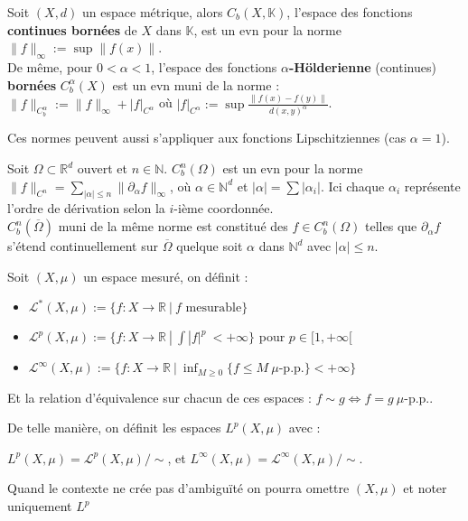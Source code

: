 \begin{ex}
    Soit $(X,d)$ un espace métrique, alors $C_b(X,\mathbb{K})$, l'espace des fonctions \textbf{continues bornées} de $X$ dans $\mathbb{K}$, est un evn pour la norme $\|f\|_\infty :=\sup\|f(x)\|$.\\
    De même, pour $ 0<\alpha <1$, l'espace des fonctions \textbf{$\alpha$-Hölderienne} (continues) \textbf{bornées} $C^\alpha_b(X)$ est un evn muni de la norme : \\
    $\|f\|_{C^\alpha_b }:=\|f\|_\infty +|f|_{C^\alpha }$ où $|f|_{C^\alpha }:=\sup \frac{\|f(x)-f(y)\|}{d(x,y)^\alpha }$.
\end{ex}
Ces normes peuvent aussi s'appliquer aux fonctions Lipschitziennes (cas $\alpha = 1$).

\begin{ex}
    Soit $\Omega\subset \mathbb{R} ^d$ ouvert et $n\in \mathbb{N} $. $C^n _b(\Omega)$ est un evn pour la norme $\| f \|_{C^n } = \sum_{|\alpha|\leq n } \| \partial_\alpha f \|_\infty$, où $\alpha \in \mathbb{N}^d$ et $|\alpha| = \sum |\alpha_i|$. Ici chaque $\alpha_i$ représente l'ordre de dérivation selon la $i$-ième coordonnée. \\
    
    $C^n_b(\overline{\Omega})$ muni de la même norme est constitué des $f\in C^n_b(\Omega)$ telles que $\partial_\alpha f$ s'étend continuellement sur $\overline{\Omega}$ quelque soit $\alpha$ dans $\mathbb{N}^d$ avec $|\alpha| \leq n $. 
\end{ex}

\begin{definition}[Espaces $L^p$]

Soit $(X,\mu)$ un espace mesuré, on définit : 

\begin{itemize}
    \item $\mathcal{L}^*(X,\mu):=\{f:X\to \mathbb{R} \ |\ f \text{ mesurable}\}$
    \item $\mathcal{L}^p(X,\mu) := \{ f : X \to \mathbb{R} ~|~ \int |f|^p \ < +\infty\}$ pour $p \in [1,+\infty[$
    \item $\mathcal{L}^\infty(X,\mu) := \{f : X \to \mathbb{R} ~|~ \inf_{M \geq 0}\{ f \leq M ~\mu\text{-p.p.}\} < +\infty \}$ 
\end{itemize}

Et la relation d'équivalence sur chacun de ces espaces : $f \sim g \Leftrightarrow f = g ~\mu\text{-p.p.}$.

De telle manière, on définit les espaces $L^p(X,\mu)$ avec : 

$L^p(X,\mu) = \mathcal{L}^p(X,\mu)/\sim$, et $L^\infty (X,\mu) = \mathcal{L}^{\infty}(X,\mu)/\sim $. 

Quand le contexte ne crée pas d'ambiguïté on pourra omettre $(X,\mu)$ et noter uniquement $L^p$ 
\end{definition}

